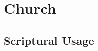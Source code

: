 \section{Church}
	\label{CHURCH}
	




	


\subsection{Scriptural Usage} %
	\label{CHURCH-SCRIPTURES}

